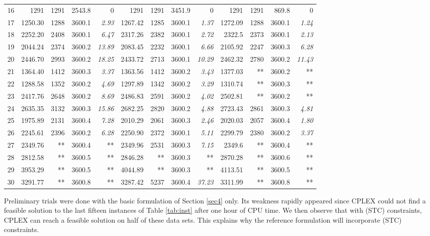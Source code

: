 \documentclass[11pt]{article}
\theoremstyle{plain}%
\theoremstyle{definition} \newtheorem{lem}{Lemma}[section]
\theoremstyle{definition} \newtheorem{claim}{Claim}[lem]
\theoremstyle{definition} \newtheorem{theorem}{Theorem}[section]
\theoremstyle{definition} \newtheorem{exo}{Exercice n$^\circ$}
\theoremstyle{definition} \newtheorem{quest}{}[exo]
\theoremstyle{definition} \newtheorem{sousquest}{}[quest]
\theoremstyle{remark}
\theoremstyle{definition}
\begin{document}
\begin{table}[H]
\begin{tabular}{|r|rrrr|rrrr|rrrr|}
    16    & 1291  & 1291&  2543.8 & 0 & 1291  & 1291    & 3451.9 & 0 & 1291  & 1291& 869.8 & 0 \\
    17    & 1250.30 & 1288&3600.1 & {\it 2.93} & 1267.42 & 1285 & 3600.1 & {\it 1.37} & 1272.09 & 1288 & 3600.1 & {\it 1.24}\\
    18    & 2252.20 & 2408& 3600.1 & {\it 6.47}& 2317.26 & 2382  & 3600.1 & {\it 2.72} & 2322.5 & 2373& 3600.1 & {\it 2.13}\\
    19    & 2044.24 & 2374& 3600.2 & {\it 13.89}& 2083.45 & 2232& 3600.1 & {\it 6.66}& 2105.92 & 2247& 3600.3 & {\it 6.28} \\
    20    & 2446.70 & 2993&  3600.2 & {\it 18.25}& 2433.72 & 2713 & 3600.1 & {\it 10.29}& 2462.32 & 2780& 3600.2 & {\it 11.43} \\
    21    & 1364.40 & 1412& 3600.3 &{\it  3.37}  &  1363.56 & 1412& 3600.2 & {\it 3.43}& 1377.03 & **  & 3600.2 & ** \\
    22    & 1288.58 & 1352& 3600.2 & {\it  4.69} & 1297.89 & 1342 & 3600.2 & {\it  3.29} & 1310.74 & **& 3600.3 & ** \\
    23    & 2417.76 & 2648&3600.2 & {\it  8.69} & 2486.83 & 2591 & 3600.2 & {\it  4.02} & 2502.81 & **& 3600.2 & ** \\
    24     & 2635.35 & 3132& 3600.3 & {\it  15.86} & 2682.25 & 2820& 3600.2 & {\it  4.88} & 2723.43 & 2861 & 3600.3 & {\it  4.81}\\
    25    & 1975.89 & 2131 & 3600.4 & {\it  7.28} & 2010.29 & 2061 &3600.3 & {\it  2.46} & 2020.03 & 2057   & 3600.4 & {\it  1.80}\\
    26  & 2245.61 & 2396 & 3600.2 & {\it  6.28}& 2250.90 & 2372  & 3600.1 & {\it  5.11}  & 2299.79 & 2380& 3600.2 &{\it   3.37}\\
    27    & 2349.76 & **& 3600.4 & **  & 2349.96 & 2531  & 3600.3 & {\it  7.15}& 2349.6 & **    & 3600.4 & ** \\
    28    & 2812.58 & **  & 3600.5 &** & 2846.28 & **    &3600.3 & ** & 2870.28 & **& 3600.6 & ** \\
    29    & 3953.29 & **& 3600.5 & **  & 4044.89 & **  & 3600.3 & **& 4113.51 & ** & 3600.5 & ** \\
    30    & 3291.77 & **    &  3600.8 & ** & 3287.42 & 5237&  3600.4 & {\it  37.23}& 3311.99 & **   & 3600.8 & **  \\
    \bottomrule
    \end{tabular}%
  \label{tab:champEC}%
\end{table}%

Preliminary trials were done with the basic formulation of Section \ref{sec4} only.  Its weakness rapidly appeared
since CPLEX could not find  a feasible solution to the last fifteen  instances of Table \ref{tab:inst} after one hour
of CPU time. 
We then observe that with (STC) constraints, CPLEX can reach a feasible solution on half of these data sets.
This explains why  the reference formulation will  incorporate (STC) constraints.
\end{document}
